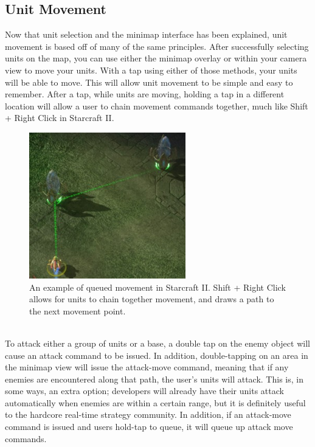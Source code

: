 \documentclass[11pt]{article}
\begin{document}
	\subsection{Unit Movement}
	Now that unit selection and the minimap interface has been explained, unit movement is based off of many of the same principles. After successfully selecting units on the map, you can use either the minimap overlay or within your camera view to move your units. With a tap using either of those methods, your units will be able to move. This will allow unit movement to be simple and easy to remember. After a tap, while units are moving, holding a tap in a different location will allow a user to chain movement commands together, much like Shift + Right Click in Starcraft II.\\
	\begin{figure}[h]
	\begin{center}
	\includegraphics[height = 2.5in]{sc2-movement-queue}
	\caption{An example of queued movement in Starcraft II. Shift + Right Click allows for units to chain together movement, and draws a path to the next movement point.}
	\end{center}
	\end{figure} \\
	\indent To attack either a group of units or a base, a double tap on the enemy object will cause an attack command to be issued. In addition, double-tapping on an area in the minimap view will issue the attack-move command, meaning that if any enemies are encountered along that path, the user's units will attack. This is, in some ways, an extra option; developers will already have their units attack automatically when enemies are within a certain range, but it is definitely useful to the hardcore real-time strategy community. In addition, if an attack-move command is issued and users hold-tap to queue, it will queue up attack move commands.
\end{document}

